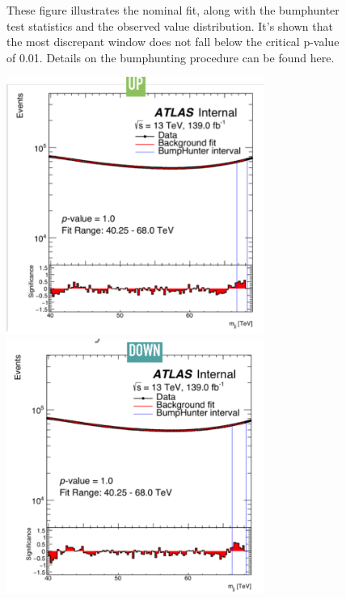 \begin{itemize}
\begin{figure}[!htb]
\begin{center}
        \caption{
        These figure illustrates the nominal fit, along with the bumphunter test statistics and the observed value distribution. It's shown that the most discrepant window does not fall below the critical p-value of 0.01. Details on the bumphunting procedure can be found here. }
            \label{fig:dimuonstudies}
    \end{center}
\end{figure}


\begin{figure}[!htb]
    \begin{center}
        \includegraphics[width=0.75\textwidth]{figures/chapter_dimuon/UpVariation}
        \includegraphics[width=0.75\textwidth]{figures/chapter_dimuon/DownVariation}

\end{center}
\end{figure}
\end{itemize}

